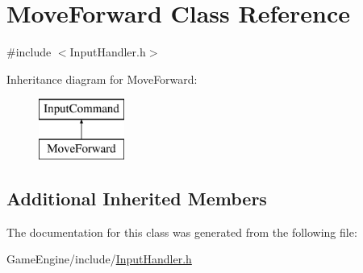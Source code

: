 \hypertarget{class_move_forward}{}\section{Move\+Forward Class Reference}
\label{class_move_forward}


{\ttfamily \#include $<$Input\+Handler.\+h$>$}

Inheritance diagram for Move\+Forward\+:\begin{figure}[H]
\begin{center}
\leavevmode
\includegraphics[height=2.000000cm]{class_move_forward}
\end{center}
\end{figure}
\subsection*{Additional Inherited Members}


The documentation for this class was generated from the following file\+:\begin{DoxyCompactItemize}
\item 
Game\+Engine/include/\mbox{\hyperlink{_input_handler_8h}{Input\+Handler.\+h}}\end{DoxyCompactItemize}
